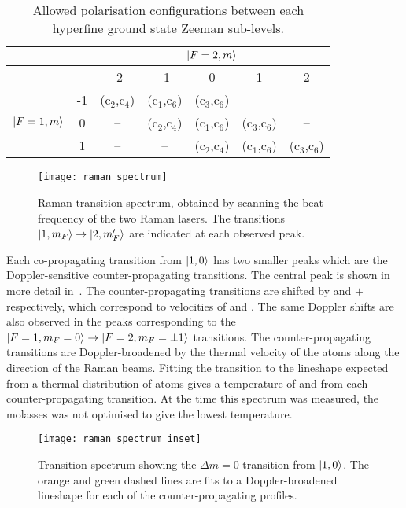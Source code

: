 \begin{table}
  \centering
  \begin{tabular}{ccccccc}
    \toprule
     & & \multicolumn{5}{c}{\(\ket{F=2,m}\)} \\
     \midrule
     & & -2 & -1 & 0 & 1 & 2 \\
     \multirow{3}{*}{\(\ket{F=1,m}\)} & -1 & (c\(_2\),c\(_4\)) &
     (c\(_1\),c\(_6\)) &(c\(_3\),c\(_6\))& -- & --  \\
     & 0 &-- & (c\(_2\),c\(_4\))& (c\(_1\),c\(_6\)) & (c\(_3\),c\(_6\))
     &-- \\
     & 1 & --& --&(c\(_2\),c\(_4\))& (c\(_1\),c\(_6\)) & (c\(_3\),c\(_6\)) \\
    \bottomrule
  \end{tabular}
  \caption{Allowed polarisation configurations between each hyperfine
  ground state Zeeman sub-levels.}
  \label{tab:raman_trans}
\end{table}
\begin{figure}[htpb]
  \centering
  \texttt{[image: raman\_spectrum]}
  \caption[Raman transition spectrum]{Raman transition spectrum, obtained by scanning the beat
    frequency of the two Raman lasers. The transitions \(\ket{1,m_F}
  \rightarrow \ket{2,m_F'}\) are indicated at each observed peak.}
  \label{fig:raman_spectrum}
\end{figure}
\par\noindent
Each co-propagating transition from \(\ket{1,0}\) has two smaller
peaks which are the Doppler-sensitive counter-propagating transitions.
The central peak is shown in more detail
in~. The counter-propagating
transitions are shifted by  and
\(+\) respectively, which correspond to
velocities of  and
. The same Doppler shifts are also
observed in the peaks corresponding to the \(\ket{F=1,m_F = 0}
\rightarrow \ket{F=2,m_F=\pm 1}\) transitions. The counter-propagating transitions are
Doppler-broadened by the thermal velocity of the atoms along the direction
of the Raman beams. Fitting the transition to the lineshape expected
from a thermal distribution of atoms gives a temperature of
 and  from
each counter-propagating transition. At the time this spectrum was
measured, the molasses was not optimised to give the lowest
temperature.
\begin{figure}[htpb!]
  \centering
  \texttt{[image: raman\_spectrum\_inset]}
  \caption[\(\Delta m = 0\) transition spectrum.]{Transition spectrum showing the \(\Delta m = 0\) transition
  from \(\ket{1,0}\). The orange and green dashed lines are fits to a
Doppler-broadened lineshape for each of the counter-propagating
profiles.}
  \label{fig:raman_spectrum_inset}
\end{figure}

